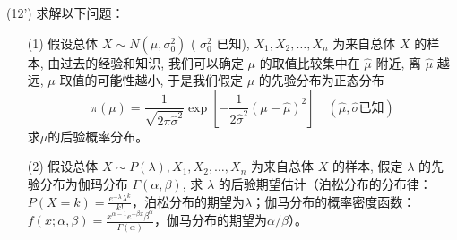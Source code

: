 \documentclass[12pt,a4paper,openany,twoside]{ctexbook}
\begin{document}
\begin{exercise}(12')
	求解以下问题：
\begin{itemize}
	\item [(1)] 假设总体 $X \sim N\left(\mu, \sigma_0^{2}\right)$ ( $\sigma_0^{2}$ 已知), $X_{1}, X_{2}, \ldots, X_{n}$ 为来自总体 $X$ 的样 本, 由过去的经验和知识, 我们可以确定 $\mu$ 的取值比较集中在 $\hat{\mu}$ 附近, 离 $\hat{\mu}$ 越远, $\mu$ 取值的可能性越小, 于是我们假定 $\mu$ 的先验分布为正态分布
	$$
	\pi(\mu)=\frac{1}{\sqrt{2 \pi \hat{\sigma}^{2}}} \exp \left[-\frac{1}{2 \hat{\sigma}^{2}}\left(\mu-\hat{\mu}\right)^{2}\right] \quad (\hat{\mu}, \hat{\sigma} \text{已知})
	$$
	求$\mu$的后验概率分布。
	\item [(2)] 假设总体 $X \sim P(\lambda), X_{1}, X_{2}, \ldots, X_{n}$ 为来自总体 $X$ 的样本, 假定 $\lambda$ 的先 验分布为伽玛分布 $\Gamma(\alpha, \beta)$, 求 $\lambda$ 的后验期望估计（泊松分布的分布律：$P(X=k) = \frac{e^{-\lambda} \lambda^k}{k!}$，泊松分布的期望为$\lambda$；伽马分布的概率密度函数：$f(x ; \alpha, \beta)=\frac{x^{\alpha-1} e^{-\beta x} \beta^{\alpha}}{\Gamma(\alpha)}$，伽马分布的期望为$\alpha/\beta$）。
\end{itemize}

\end{exercise}
\end{document}

